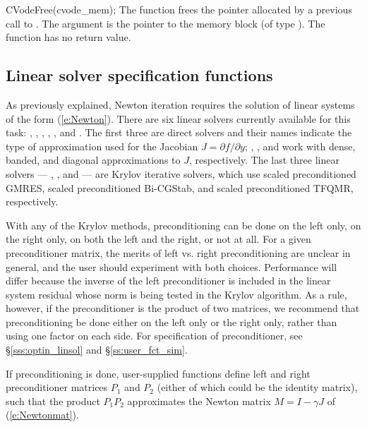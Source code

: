 {
  CVodeFree(cvode\_mem);
}
{
  The function  frees the pointer allocated by
  a previous call to .
}
{
  The argument is the pointer to the {\cvode} memory block (of type ).
}
{
  The function  has no return value.
}
{}
\subsection{Linear solver specification functions}\label{sss:lin_solv_init}

As previously explained, Newton iteration requires the solution of
linear systems of the form (\ref{e:Newton}).  There are six {\cvode} linear
solvers currently available for this task: {\cvdense}, {\cvband}, {\cvdiag},
{\cvspgmr}, {\cvspbcg}, and {\cvsptfqmr}.  The first three are direct solvers
and their names indicate the type of approximation used for the Jacobian 
$J = \partial{f}/\partial{y}$; {\cvdense}, {\cvband}, and {\cvdiag} work with
dense, banded, and diagonal approximations to $J$, respectively.  The last
three {\cvode} linear solvers --- {\cvspgmr}, {\cvspbcg}, and {\cvsptfqmr} ---
are Krylov iterative solvers, which use scaled preconditioned GMRES, scaled
preconditioned Bi-CGStab, and scaled preconditioned TFQMR, respectively.

With any of the Krylov methods, preconditioning 
can be done on the left only, on the right only, on both the left and the right, 
or not at all.  For a given preconditioner matrix, the merits of left vs. right
preconditioning are unclear in general, and the user should experiment
with both choices.  Performance will differ because the inverse of the
left preconditioner is included in the linear system residual whose
norm is being tested in the Krylov algorithm.  As a rule, however, if
the preconditioner is the product of two matrices, we recommend that
preconditioning be done either on the left only or the right only,
rather than using one factor on each side. For specification of preconditioner,
see \S\ref{sss:optin_linsol} and \S\ref{ss:user_fct_sim}.

If preconditioning is done, user-supplied functions define left and right 
preconditioner matrices $P_1$ and $P_2$ (either of which could be the identity
matrix), such that the product $P_1 P_2$ approximates the Newton matrix
$M = I - \gamma J$ of (\ref{e:Newtonmat}).

